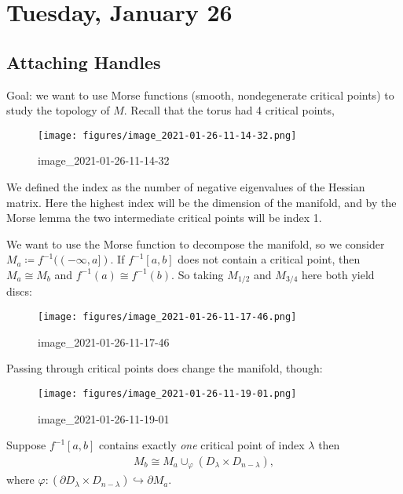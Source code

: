 \hypertarget{tuesday-january-26}{%
\section{Tuesday, January 26}\label{tuesday-january-26}}

\hypertarget{attaching-handles}{%
\subsection{Attaching Handles}\label{attaching-handles}}

Goal: we want to use Morse functions (smooth, nondegenerate critical
points) to study the topology of \(M\). Recall that the torus had 4
critical points,

\begin{figure}
\centering
\texttt{[image: figures/image\_2021-01-26-11-14-32.png]}
\caption{image\_2021-01-26-11-14-32}
\end{figure}

We defined the index as the number of negative eigenvalues of the
Hessian matrix. Here the highest index will be the dimension of the
manifold, and by the Morse lemma the two intermediate critical points
will be index 1.

\begin{remark}

We want to use the Morse function to decompose the manifold, so we
consider \(M_a \coloneqq f ^{-1} ((- \infty , a ])\). If
\(f ^{-1} [a, b]\) does not contain a critical point, then
\(M_a \cong M_b\) and \(f ^{-1} (a) \cong f ^{-1} (b)\). So taking
\(M_{1/2}\) and \(M_{3/4}\) here both yield discs:

\begin{figure}
\centering
\texttt{[image: figures/image\_2021-01-26-11-17-46.png]}
\caption{image\_2021-01-26-11-17-46}
\end{figure}

Passing through critical points does change the manifold, though:

\begin{figure}
\centering
\texttt{[image: figures/image\_2021-01-26-11-19-01.png]}
\caption{image\_2021-01-26-11-19-01}
\end{figure}

\end{remark}

\begin{theorem}[?]

Suppose \(f ^{-1} [a, b]\) contains exactly \emph{one} critical point of
index \(\lambda\) then
\begin{align*}
M_b \cong M_a \cup_{\varphi} (D_ \lambda \times D_{n - \lambda})
,\end{align*}
where
\(\varphi: ({{\partial}}D_ \lambda \times D_{ n - \lambda}) \hookrightarrow{{\partial}}M_a\).

\end{theorem}

